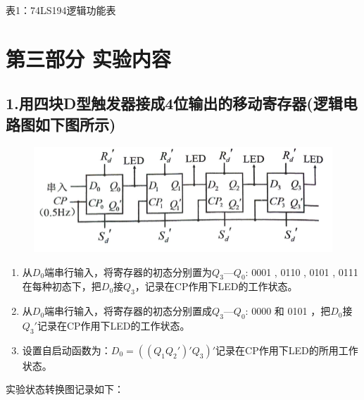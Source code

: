 \documentclass{ctexart}
\begin{document}
    \begin{table}[!ht]
    \centering
    表1：74LS194逻辑功能表
    
    \end{table}

    \newpage
    \section*{第三部分 \quad 实验内容}
    \subsection*{1.用四块D型触发器接成4位输出的移动寄存器(逻辑电路图如下图所示)}
    \begin{figure}[htbp]
        \centering
        \includegraphics[width=14cm]{3.1.png}
    \end{figure}
    \begin{enumerate}[(1)]
        \item 从$D_0$端串行输入，将寄存器的初态分别置为$Q_3—Q_0$: 0001 , 0110 , 0101 , 0111 在每种初态下，把$D_0$接$Q_3$，记录在CP作用下LED的工作状态。
        \item 从$D_0$端串行输入，将寄存器的初态分别置成$Q_3—Q_0$: 0000 和 0101 ，把$D_0$接$Q_3'$记录在CP作用下LED的工作状态。
        \item 设置自启动函数为：$D_0=((Q_1Q_2')'Q_3)'$记录在CP作用下LED的所用工作状态。
    \end{enumerate}
实验状态转换图记录如下：
    
\end{document}
